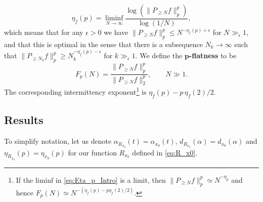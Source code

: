 \documentclass[11pt,reqno]{amsart}
\theoremstyle{definition}
\begin{document}
\begin{equation}\label{eq:Eta_p_Intro}
\eta_f(p) = \liminf_{N \to \infty} \frac{\log (\lVert  P_{\geq N} f \rVert_p^p ) }{\log (1/N)},
\end{equation}
which means that for any $\epsilon > 0$ we have
$ \lVert  P_{\geq N} f \rVert_p^p \leq  N^{-\eta_f(p) + \epsilon}$
for $N \gg_\epsilon 1$, 
and that this is optimal
in the sense that there is a subsequence $N_k \to \infty$ such that 
$ \lVert  P_{\geq N_k} f \rVert_p^p \geq  N_k^{-\eta_f(p) - \epsilon}$
for $k \gg_\epsilon 1$. 
We define the \textbf{$\boldsymbol{p}$-flatness} to be
\begin{equation}
F_p(N) = \frac{\lVert P_{\geq N} f \rVert_p^p}{\lVert P_{\geq N} f \rVert_2^p}, \qquad N \gg 1.
\end{equation}
The corresponding intermittency exponent\footnote{If the liminf in \eqref{eq:Eta_p_Intro} is a limit, then $\lVert P_{\geq N} f \rVert_p^p \simeq N^{-\eta_p}$ and hence $F_p(N) \simeq N^{-(\eta_f(p) - p\eta_f(2) /2 )}$.}  is $\eta_f(p) - p\, \eta_f(2)/2$. 




\subsection{Results}\label{sec:Results}
To simplify notation, let us denote 
$\alpha_{R_{x_0}}(t) = \alpha_{x_0}(t)$, $d_{R_{x_0}}(\alpha) = d_{x_0}(\alpha)$
and $\eta_{R_{x_0}}(p) = \eta_{x_0}(p)$
for our function $R_{x_0}$ defined in \eqref{eq:R_x0}.
\end{document}
